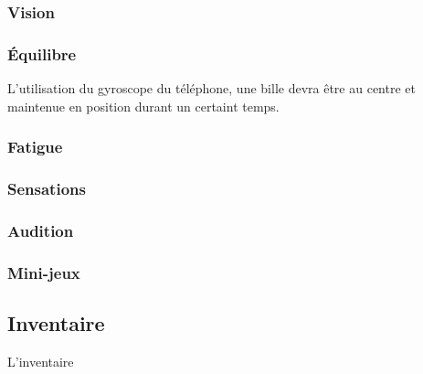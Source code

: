 \documentclass[a4paper,12pt,francais]{article}
\begin{document}
\subsubsection{Vision}
\subsubsection{Équilibre}
L'utilisation du gyroscope du téléphone, une bille devra être au centre et maintenue en position durant un certaint temps.
\subsubsection{Fatigue}
\subsubsection{Sensations}
\subsubsection{Audition}
\subsubsection{Mini-jeux}
\subsection{Inventaire}
L'inventaire
\end{document}
